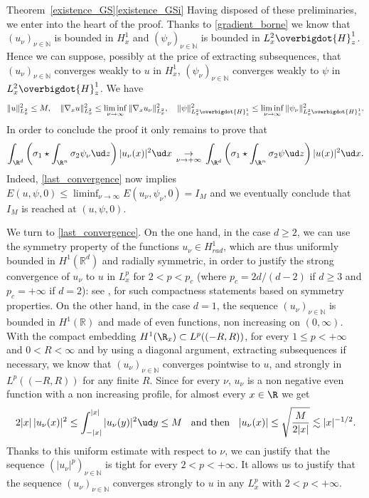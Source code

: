 \begin{ProofOf}{Theorem~\ref{existence_GS}\eqref{existence_GSi}}
Having disposed of these preliminaries, we enter into the heart of the proof. Thanks to \eqref{gradient_borne} we know that $(u_{\nu})_{\nu\in \mathbb N}$ is bounded in $H_{x}^{1}$ and $(\psi_{\nu})_{\nu\in \mathbb N}$ is bounded in $L_{x}^{2}\overbigdot{H}_{z}^{1}$. Hence we can suppose, possibly at the price of extracting subsequences, that $(u_{\nu})_{\nu\in \mathbb N}$ converges weakly to $u$ in $H_{x}^{1}$, $(\psi_{\nu})_{\nu\in \mathbb N}$ converges weakly to $\psi$ in $L_{x}^{2}\overbigdot{H}_{z}^{1}$. We have
\[
\|u\|_{L_{x}^{2}}^{2}\leq M,\quad \|\nabla_{x}u\|_{L_{x}^{2}}^{2}\leq\liminf_{\nu\to \infty}\|\nabla_{x}u_{\nu}\|_{L_{x}^{2}}^{2},\quad \|\psi\|_{L_{x}^{2}\overbigdot{H}_{z}^{1}}^{2}\leq\liminf_{\nu\to \infty}\|\psi_{\nu}\|_{L_{x}^{2}\overbigdot{H}_{z}^{1}}^{2}.
\]
In order to conclude the proof it only remains to prove that\vspace*{-3pt}
\begin{equation}\label{last_convergence}
\int_{\R^{d}}\left(\sigma_{1}\star\int_{\R^{n}}\sigma_{2}\psi_{\nu}\ud z\right)|u_{\nu}(x)|^{2}\ud x\,\underset{\nu\to +\infty}{\to}\,\int_{\R^{d}}\left(\sigma_{1}\star\int_{\R^{n}}\sigma_{2}\psi\ud z\right)|u(x)|^{2}\ud x.
\end{equation}
Indeed, \eqref{last_convergence} now implies $E(u,\psi,0)\leq\liminf_{\nu\to\infty} E(u_{\nu},\psi_{\nu},0)=I_{M}$ and we eventually conclude that $I_{M}$ is reached at $(u,\psi,0)$.

We turn to \eqref{last_convergence}. On the one hand, in the case $d\geq 2$,
we can use the symmetry property of the functions $u_{\nu}\in H_{rad}^{1}$,
which are thus uniformly bounded in $H^1(\mathbb R^d)$ and radially symmetric,
in order to justify the strong convergence of $u_{\nu}$ to $u$ in $L_{x}^{p}$ for $2<p<p_{c}$ (where $p_{c}=2d/(d-2)$ if $d\geq 3$ and $p_{c}=+\infty$ if $d=2$):
see \cite[Prop.\,1.1]{Pllsc}, \cite[Radial Lem.\,1]{Strauss} for such compactness statements based on symmetry properties. On the other hand, in the case $d=1$,
the sequence $(u_{\nu})_{\nu\in \mathbb N}$ is bounded in $H^1(\mathbb R)$
and made of even functions, non increasing on $(0,\infty)$.
With the compact embedding
$H^{1}(\R_{x})\subset L^{p}((-R,R))$, for every $1\leq p<+\infty$ and $0<R<\infty$
and by using a diagonal argument, extracting subsequences if necessary, we know that $(u_{\nu})_{\nu\in\mathbb N}$ converges pointwise to $u$, and strongly in $L^p((-R,R))$ for any finite $R$.
Since for every $\nu$, $u_{\nu}$ is a non negative even function with a non increasing profile, for almost every
$x\in\R$ we get
\[
2|x|\,|u_{\nu}(x)|^{2}\leq\int_{-|x|}^{|x|}|u_{\nu}(y)|^{2}\ud y\leq M \hspace{0.2cm}\text{ and then }\hspace{0.2cm} |u_{\nu}(x)|\leq\sqrt{\frac{M}{2|x|}}\lesssim|x|^{-1/2}.
\]
Thanks to this uniform estimate with respect to $\nu$, we can justify that the sequence $(|u_{\nu}|^{p})_{\nu\in \mathbb N}$ is tight for every $2<p<+\infty$.
It
allows us to justify that the sequence $(u_{\nu})_{\nu\in \mathbb N}$ converges strongly to $u$ in any $L_{x}^{p}$ with $2<p<+\infty$.


\end{ProofOf}
